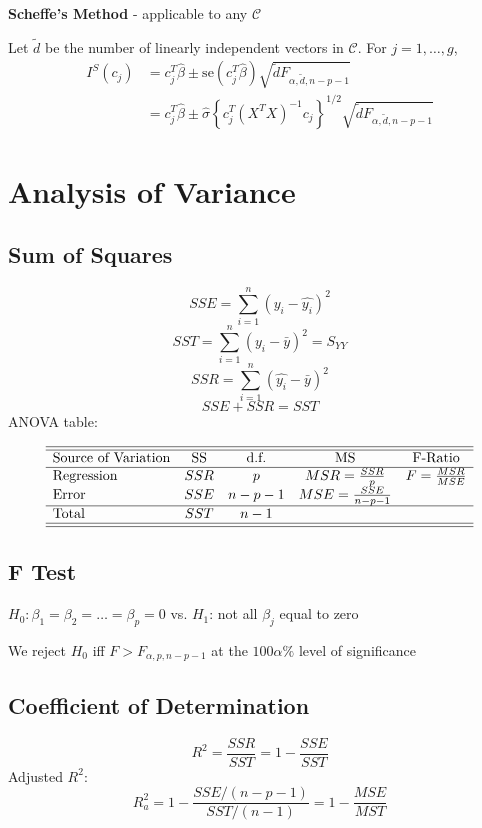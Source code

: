 \documentclass[11pt,a4paper]{article}
\begin{document}
\textbf{Scheffe's Method} - applicable to any $\mathcal{C}$ \par
Let $\tilde{d}$ be the number of linearly independent vectors in $\mathcal{C}$. For $j = 1, \dots, g$,
\begin{align*}
I^S(c_j)    &= c_j^T \hat{\beta} \pm \text{se}(c_j^T \hat{\beta}) \sqrt{\tilde{d} F_{\alpha, \tilde{d}, n-p-1}} \\
            &= c_j^T \hat{\beta} \pm \hat{\sigma} \left\{c_j^T (X^TX)^{-1} c_j\right\}^{1/2} \sqrt{\tilde{d} F_{\alpha, \tilde{d}, n-p-1}}
\end{align*}

\section{Analysis of Variance}
\subsection{Sum of Squares}
\[
SSE = \sum_{i=1}^{n} (y_i - \hat{y_i})^2
\]
\[
SST = \sum_{i=1}^{n} (y_i - \bar{y})^2 = S_{YY}
\]
\[
SSR = \sum_{i=1}^{n} (\hat{y_i} - \bar{y})^2
\]
\[
SSE + SSR = SST
\]
ANOVA table: \par
\[
\begin{array}{lcccc}
    \hline\hline
    \text{Source of Variation} & \text{SS} & \text{d.f.} & \text{MS} & \text{F-Ratio} \\
    \hline
    \text{Regression} & SSR & p & MSR = \frac{SSR}{p} & F = \frac{MSR}{MSE} \\
    \text{Error} & SSE & n-p-1 & MSE = \frac{SSE}{n-p-1} & \\
    \hline
    \text{Total} & SST & n-1 & & \\
    \hline\hline
\end{array}
\]

\subsection{F Test}
$H_0: \beta_1 = \beta_2 = \dots = \beta_p = 0$ vs. $H_1$: not all $\beta_j$ equal to zero \par
We reject $H_0$ iff $F > F_{\alpha, p, n-p-1}$ at the $100\alpha\%$ level of significance \par

\subsection{Coefficient of Determination}
\[
R^2 = \frac{SSR}{SST} = 1 - \frac{SSE}{SST}
\]
Adjusted $R^2$:
\[
R_a^2 = 1 - \frac{SSE/(n-p-1)}{SST/(n-1)} = 1 - \frac{MSE}{MST}
\]
\end{document}
